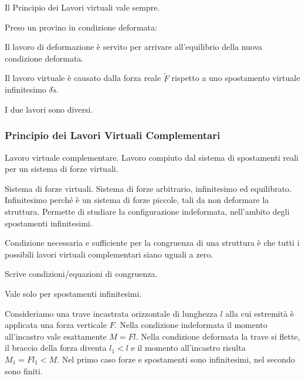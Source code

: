 Il Principio dei Lavori virtuali vale sempre.

\begin{esempioBox}
Preso un provino in condizione deformata:
\begin{compactitem}
    \item Il lavoro di deformazione è servito per arrivare all'equilibrio della nuova condizione deformata.
    \item Il lavoro virtuale è causato dalla forza reale $\tilde{F}$ rispetto a uno spostamento virtuale infinitesimo $\delta \tilde{s}$.
\end{compactitem}
I due lavori sono diversi.

\end{esempioBox}



\subsubsection*{Principio dei Lavori Virtuali Complementari}
\begin{definizioneBox}
    Lavoro virtuale complementare. Lavoro compiuto dal sistema di spostamenti reali per un sistema di forze virtuali.
\end{definizioneBox}
\begin{definizioneBox}
    Sistema di forze virtuali. Sistema di forze arbitrario, infinitesimo ed equilibrato.\\
    Infinitesimo perché è un sistema di forze piccole, tali da non deformare la struttura. Permette di studiare la configurazione indeformata, nell'ambito degli spostamenti infinitesimi.
\end{definizioneBox}

\begin{enunciatoBox}
    Condizione necessaria e sufficiente per la congruenza di una struttura è che tutti i possibili lavori virtuali complementari siano uguali a zero.

\end{enunciatoBox}

\begin{compactitem}
    \item Scrive condizioni/equazioni di congruenza.
    \item Vale solo per spostamenti infinitesimi.
\end{compactitem}

\begin{esempioBox}
    Consideriamo una trave incastrata orizzontale di lunghezza $l$ alla cui estremità è applicata una forza verticale $F$.
    Nella condizione indeformata il momento all'incastro vale esattamente $ M = Fl$.
    Nella condizione deformata la trave si flette, il braccio della forza diventa $l_1<l$ e il momento all'incastro risulta $M_1 = Fl_1<M$.
    Nel primo caso forze e spostamenti sono infinitesimi, nel secondo sono finiti.
\end{esempioBox}








